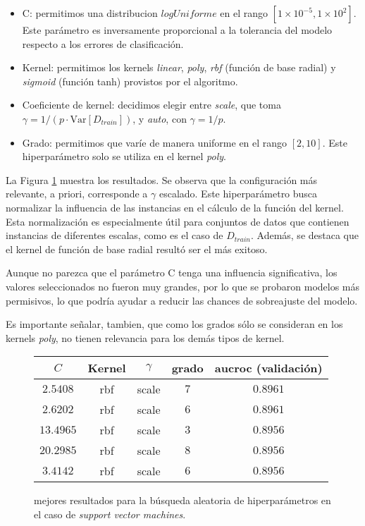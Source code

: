 \begin{itemize}
    \item C: permitimos una distribucion $\textit{logUniforme}$ en el rango $[1\times10^{-5}, 1\times10^{2}]$. Este parámetro es inversamente proporcional a la tolerancia del modelo respecto a los errores de clasificación.
    \item Kernel: permitimos los kernels \textit{linear}, \textit{poly}, \textit{rbf} (función de base radial) y \textit{sigmoid} (función tanh) provistos por el algoritmo.
    \item Coeficiente de kernel: decidimos elegir entre \textit{scale}, que toma $\gamma = 1/(p\cdot\text{Var}[D_{train}])$, y \textit{auto}, con $\gamma = 1/p$.
    \item Grado: permitimos que varíe de manera uniforme en el rango $[2, 10]$. Este hiperparámetro solo se utiliza en el kernel \textit{poly}.
\end{itemize}

La Figura \ref{support vector machines} muestra los resultados. Se observa que la configuración más relevante, a priori, corresponde a $\gamma$ escalado. Este hiperparámetro busca normalizar la influencia de las instancias en el cálculo de la función del kernel. Esta normalización es especialmente útil para conjuntos de datos que contienen instancias de diferentes escalas, como es el caso de $D_{train}$. Además, se destaca que el kernel de función de base radial resultó ser el más exitoso. 

Aunque no parezca que el parámetro C tenga una influencia significativa, los valores seleccionados no fueron muy grandes, por lo que se probaron modelos más permisivos, lo que podría ayudar a reducir las chances de sobreajuste del modelo. 

Es importante señalar, tambien, que como los grados sólo se consideran en los kernels \textit{poly}, no tienen relevancia para los demás tipos de kernel.

\vspace{0.5em}
\begin{figure}[!htbp]
    \begin{center}
        \begin{tabular}{ |c|c|c|c|c| } 
         \hline
        $C$ & Kernel & $\gamma$ & grado & aucroc (validación) \\
        \hline
        $2.5408$ & rbf     & scale & $7$ & $0.8961$ \\ 
        $2.6202$ & rbf    & scale & $6$ & $0.8961$ \\
        $13.4965$ & rbf   & scale & $3$ & $0.8956$ \\ 
        $20.2985$ & rbf   & scale & $8$ & $0.8956$ \\
        $3.4142$ & rbf    & scale & $6$ & $0.8956$ \\ 
        \hline
        \end{tabular}
    \end{center}
    \caption{mejores resultados para la búsqueda aleatoria de hiperparámetros en el caso de \textit{support vector machines}.} \label{support vector machines}
\end{figure}

